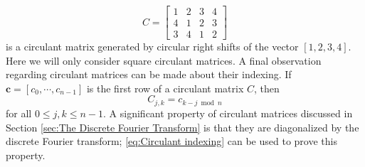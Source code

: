 \documentclass[12pt]{article}
\begin{document}
\[C = \begin{bmatrix}
1 & 2 & 3 & 4 \\
4 & 1 & 2 & 3 \\
3 & 4 & 1 & 2
\end{bmatrix}\] 
is a circulant matrix generated by circular right shifts of the vector $[1,2,3,4]$. Here we will only consider square circulant matrices.  A final observation regarding circulant matrices can be made about their indexing. If $\mathbf{c} = [c_0,\cdots,c_{n-1}]$ is the first row of a circulant matrix $C$, then
\begin{equation}
\label{eq:Circulant indexing}
C_{j,k} = c_{k-j \bmod n}
\end{equation}
for all $0 \leq j,k \leq n-1$. A significant property of circulant matrices discussed in Section \ref{sec:The Discrete Fourier Transform} is that they are diagonalized by the discrete Fourier transform; \eqref{eq:Circulant indexing} can be used to prove this property.
\end{document}
